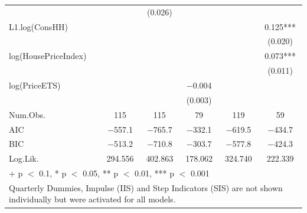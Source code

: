 \begin{table}
{\begin{tabular}[t]{lccccc}
 &  & (\num{0.026}) &  &  & \\
L1.log(ConsHH) &  &  &  &  & \num{0.125}***\\
 &  &  &  &  & (\num{0.020})\\
log(HousePriceIndex) &  &  &  &  & \num{0.073}***\\
 &  &  &  &  & (\num{0.011})\\
log(PriceETS) &  &  & \num{-0.004} &  & \\
 &  &  & (\num{0.003}) &  & \\
\midrule
Num.Obs. & \num{115} & \num{115} & \num{79} & \num{119} & \num{59}\\
AIC & \num{-557.1} & \num{-765.7} & \num{-332.1} & \num{-619.5} & \num{-434.7}\\
BIC & \num{-513.2} & \num{-710.8} & \num{-303.7} & \num{-577.8} & \num{-424.3}\\
Log.Lik. & \num{294.556} & \num{402.863} & \num{178.062} & \num{324.740} & \num{222.339}\\
\bottomrule
\multicolumn{6}{l}{\rule{0pt}{1em}+ p $<$ 0.1, * p $<$ 0.05, ** p $<$ 0.01, *** p $<$ 0.001}\\
\multicolumn{6}{l}{\rule{0pt}{1em}Quarterly Dummies, Impulse (IIS) and Step Indicators (SIS) are not shown individually but were activated for all models.}\\
\end{tabular}}
\end{table}
